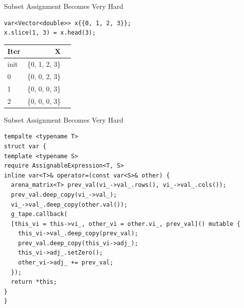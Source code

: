 \documentclass[dvipsnames, aspectratio=169]{beamer}
\begin{document}
\begin{frame}[fragile]{Subset Assignment Becomes Very Hard}
\begin{verbatim}
var<Vector<double>> x{{0, 1, 2, 3}};
x.slice(1, 3) = x.head(3);
\end{verbatim}

\begin{table}
  \centering %
  \label{tab:aliasing} %
  \begin{tabular}{|l|r|c|} %
    \hline %
    Iter & X \\ %
    \hline %
    init & \{0, 1, 2, 3\} \\
    0 & \{0, 0, 2, 3\} \\
    1 & \{0, 0, 0, 3\} \\
    2 & \{0, 0, 0, 3\} \\
    \hline %
  \end{tabular}
\end{table}
\end{frame}

\begin{frame}[fragile]{Subset Assignment Becomes Very Hard}
\begin{verbatim}
tempalte <typename T>
struct var {
template <typename S>
require AssignableExpression<T, S>
inline var<T>& operator=(const var<S>& other) {
  arena_matrix<T> prev_val(vi_->val_.rows(), vi_->val_.cols());
  prev_val.deep_copy(vi_->val_);
  vi_->val_.deep_copy(other.val());
  g_tape.callback(
  [this_vi = this->vi_, other_vi = other.vi_, prev_val]() mutable {
    this_vi->val_.deep_copy(prev_val);
    prev_val.deep_copy(this_vi->adj_);
    this_vi->adj_.setZero();
    other_vi->adj_ += prev_val;
  });
  return *this;
}
}
\end{verbatim}
\end{frame}
\end{document}
